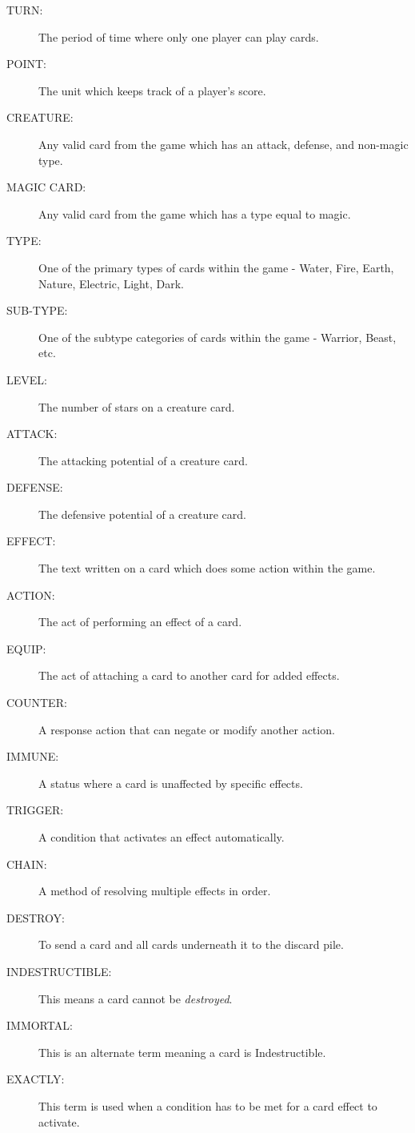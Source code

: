 \begin{description}
    \item[TURN:] The period of time where only one player can play cards.
    \item[POINT:] The unit which keeps track of a player's score.
    \item[CREATURE:] Any valid card from the game which has an attack, defense, and non-magic type.
    \item[MAGIC CARD:] Any valid card from the game which has a type equal to magic.
    \item[TYPE:] One of the primary types of cards within the game - Water, Fire, Earth, Nature, Electric, Light, Dark.
    \item[SUB-TYPE:] One of the subtype categories of cards within the game - Warrior, Beast, etc.
    \item[LEVEL:] The number of stars on a creature card.
    \item[ATTACK:] The attacking potential of a creature card.
    \item[DEFENSE:] The defensive potential of a creature card.
    \item[EFFECT:] The text written on a card which does some action within the game.
    \item[ACTION:] The act of performing an effect of a card.
    \item[EQUIP:] The act of attaching a card to another card for added effects.
    \item[COUNTER:] A response action that can negate or modify another action.
    \item[IMMUNE:] A status where a card is unaffected by specific effects.
    \item[TRIGGER:] A condition that activates an effect automatically.
    \item[CHAIN:] A method of resolving multiple effects in order.
    \item[DESTROY:] To send a card and all cards underneath it to the discard pile.
    \item[INDESTRUCTIBLE:]  This means a card cannot be \textit{destroyed}.
    \item[IMMORTAL:] This is an alternate term meaning a card is Indestructible.
    \item[EXACTLY:] This term is used when a condition has to be met for a card effect to activate.
\end{description}











